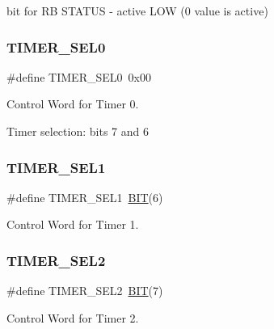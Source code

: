 bit for RB S\+T\+A\+T\+US -\/ active L\+OW (0 value is active) \hypertarget{group__i8254_ga6a4822642d40c248435692324a818010}{}\label{group__i8254_ga6a4822642d40c248435692324a818010} 
\subsubsection{\texorpdfstring{T\+I\+M\+E\+R\+\_\+\+S\+E\+L0}{TIMER\_SEL0}}
{\footnotesize\ttfamily \#define T\+I\+M\+E\+R\+\_\+\+S\+E\+L0~0x00}



Control Word for Timer 0. 

Timer selection\+: bits 7 and 6 \hypertarget{group__i8254_ga8349623fd8d99f9cc5d8ae29d78594fc}{}\label{group__i8254_ga8349623fd8d99f9cc5d8ae29d78594fc} 
\subsubsection{\texorpdfstring{T\+I\+M\+E\+R\+\_\+\+S\+E\+L1}{TIMER\_SEL1}}
{\footnotesize\ttfamily \#define T\+I\+M\+E\+R\+\_\+\+S\+E\+L1~\hyperlink{group___serial_ga3a8ea58898cb58fc96013383d39f482c}{B\+IT}(6)}



Control Word for Timer 1. 

\hypertarget{group__i8254_ga142a255de0dbc48aeabd45fc10c33672}{}\label{group__i8254_ga142a255de0dbc48aeabd45fc10c33672} 
\subsubsection{\texorpdfstring{T\+I\+M\+E\+R\+\_\+\+S\+E\+L2}{TIMER\_SEL2}}
{\footnotesize\ttfamily \#define T\+I\+M\+E\+R\+\_\+\+S\+E\+L2~\hyperlink{group___serial_ga3a8ea58898cb58fc96013383d39f482c}{B\+IT}(7)}



Control Word for Timer 2. 

\hypertarget{group__i8254_ga4745cbf21da3d3fea5dbb080b2b73bac}{}\label{group__i8254_ga4745cbf21da3d3fea5dbb080b2b73bac} 
